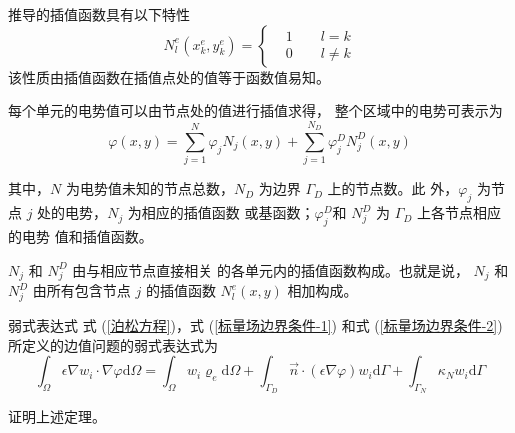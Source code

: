 \begin{theorem}
    推导的插值函数具有以下特性
    \begin{equation}
        N_l^e(x^e_k,y^e_k)
        =\left\{
            \begin{aligned}
                &1\qquad l=k\\
                &0\qquad l\neq k
            \end{aligned}
        \right.
    \end{equation}
    该性质由插值函数在插值点处的值等于函数值易知。
\end{theorem}

\par 每个单元的电势值可以由节点处的值进行插值求得，
整个区域中的电势可表示为
\begin{equation}
    \varphi(x,y)=\sum_{j=1}^{N} \varphi_j N_j(x,y)
    +\sum_{j=1}^{N_D} \varphi_{j}^D N_{j}^D(x,y)
\end{equation}
\par 其中，$N$ 为电势值未知的节点总数，$N_D$ 为边界
$\Gamma_D$ 上的节点数。此
外，$\varphi_j$ 为节点 $j$ 处的电势，$N_j$ 为相应的插值函数
或基函数；$\varphi_j^D$和 $N_j^D$ 为 $\Gamma_D$ 上各节点相应的电势
值和插值函数。

\begin{note}
    $N_j$ 和 $N_j^D$ 由与相应节点直接相关
    的各单元内的插值函数构成。也就是说，
    $N_j$ 和 $N_j^D$ 由所有包含节点 $j$ 的插值函数 $N_l^e(x,y)$ 相加构成。
\end{note}

\begin{theorem}{弱式表达式}
    式 (\ref{泊松方程})，式 (\ref{标量场边界条件-1}) 和式
    (\ref{标量场边界条件-2}) 所定义的边值问题的弱式表达式为
    \begin{equation}
        \int_{\Omega}\epsilon\nabla w_i\cdot\nabla \varphi\text{d}\Omega
        =\int_{\Omega}w_i\varrho_e\text{d}\Omega
        +\int_{\Gamma_D}\vec{n}\cdot(\epsilon\nabla\varphi)w_i\text{d}\Gamma
        +\int_{\Gamma_N}\kappa_N w_i\text{d}\Gamma
    \end{equation}
\end{theorem}

\begin{exercise}
    证明上述定理。
\end{exercise}

